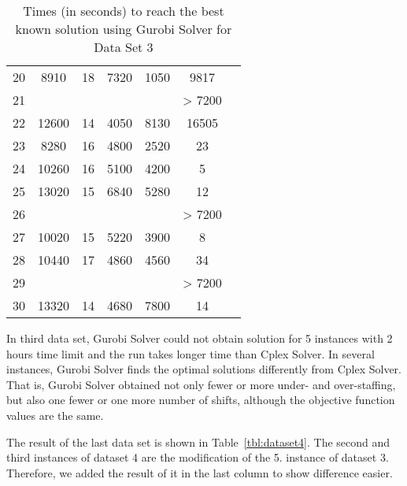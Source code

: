 \begin{table}
\begin{tabular}{ccccccc}
20 &   8910	& 18 & 7320 & 1050 & 9817  \\

21 &  	&  &  &   &  > 7200  \\

22 &  12600	& 14 & 4050 & 8130 & 16505   \\

23 &  8280 	& 16 & 4800 & 2520 & 23  \\

24 &  10260	& 16 & 5100 & 4200 & 5  \\

25 &  13020	& 15 & 6840 & 5280 & 12     \\

26 &  	&  &  & & > 7200   \\

27 &  10020	& 15 & 5220 & 3900 & 8   \\

28 &   10440	& 17 & 4860 & 4560 & 34  \\

29 &  	&  &  &   &  > 7200  \\

30 &  13320	& 14 & 4680 & 7800 & 14   \\
\hline
\end{tabular}
\caption{Times (in seconds) to reach the best known solution using Gurobi Solver for Data Set 3}
\label{tbl:dataset3gurobi}
\end{table}

In third data set, Gurobi Solver could not obtain solution for 5 instances with 2 hours time limit and the run takes longer time than Cplex Solver. In several instances, Gurobi Solver finds the optimal solutions differently from Cplex Solver. That is, Gurobi Solver obtained not only  fewer or more under-  and over-staffing, but also one fewer or one more number of shifts, although the objective function values are the same.

The result of the last data set is shown in Table~\ref{tbl:dataset4}. The second and third instances of dataset 4 are the modification of  the 5. instance of dataset 3. Therefore, we added the result of it in the last column to show difference easier.


